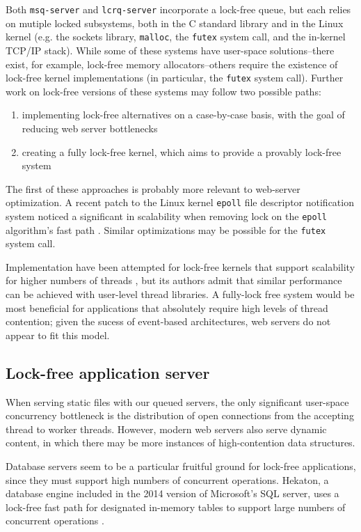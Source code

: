 \documentclass[twoside,10pt]{article}
\begin{document}
\begin{multicols}{2}
Both \verb+msq-server+ and \verb+lcrq-server+ incorporate a lock-free
queue, but each relies on mutiple locked subsystems, both in the C
standard library and in the Linux kernel (e.g. the sockets library,
\verb+malloc+, the \verb+futex+ system call, and the in-kernel TCP/IP
stack). While some of these systems have user-space solutions\---there
exist, for example, lock-free memory allocators\---others require the
existence of lock-free kernel implementations (in particular, the
\verb+futex+ system call). Further work on lock-free versions of these
systems may follow two possible paths:
\begin{enumerate}
\item implementing lock-free alternatives on a case-by-case basis,
  with the goal of reducing web server bottlenecks 
\item creating a fully lock-free kernel, which aims to provide a
  provably lock-free system
\end{enumerate}

The first of these approaches is probably more relevant to web-server
optimization. A recent patch to the Linux kernel \verb+epoll+ file
descriptor notification system noticed a significant in scalability
when removing lock on the \verb+epoll+ algorithm's fast path
\cite{lockfree-epoll}. Similar optimizations may be possible for the
\verb+futex+ system call.

Implementation have been attempted for lock-free kernels that support
scalability for higher numbers of threads \cite{massalin1992lock}, but
its authors admit that similar performance can be achieved with
user-level thread libraries. A fully-lock free system would be most
beneficial for applications that absolutely require high levels of
thread contention; given the sucess of event-based architectures, web
servers do not appear to fit this model.

\subsection{Lock-free application server}

When serving static files with our queued servers, the only
significant user-space concurrency bottleneck is the distribution of
open connections from the accepting thread to worker threads. However,
modern web servers also serve dynamic content, in which there may be
more instances of high-contention data structures.

Database servers seem to be a particular fruitful ground for lock-free
applications, since they must support high numbers of concurrent
operations. Hekaton, a database engine included in the 2014 version of
Microsoft's SQL server, uses a lock-free fast path for designated
in-memory tables to support large numbers of concurrent operations
\cite{diaconu2013hekaton}.


\end{multicols}
\end{document}

